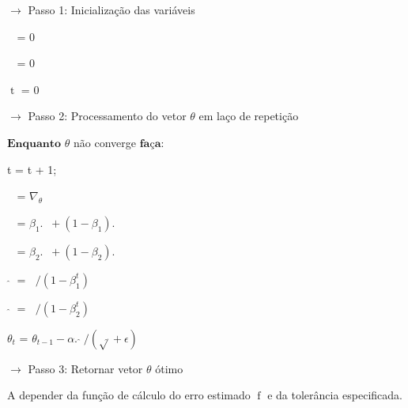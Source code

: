 $\longrightarrow$ Passo 1: Inicialização das variáveis

$\mathop{m_{0}}$ = 0

$\mathop{v_{0}}$ = 0

$\mathop{t}$ = 0

$\longrightarrow$ Passo 2: Processamento do vetor $\theta$ em laço de repetição

$\mathbf{Enquanto}$ $\theta$ não converge $\mathbf{faça:}$

t = t + 1;

$\mathop{g_{t}}$ = $\nabla_{\theta}\mathop{f_{t}(\theta_{t-1})}$

$\mathop{m_{t}}$ = $\beta_{1}.\mathop{m_{t-1}}+(1-\beta_{1}).\mathop{g_{t}}$

$\mathop{v_{t}}$ = $\beta_{2}.\mathop{v_{t-1}}+(1-\beta_{2}).\mathop{g_{t}^2}$

$\hat{\mathop{m_{t}}}$ = $\mathop{m_{t}}/(1-\beta_{1}^{t})$

$\hat{\mathop{v_{t}}}$ = $\mathop{v_{t}}/(1-\beta_{2}^{t})$

$\theta_{t}$ = $\theta_{t-1}-\alpha.\hat{\mathop{m_{t}}}/(\sqrt{\hat{\mathop{v_{t}}}}+\epsilon)$

$\longrightarrow$ Passo 3: Retornar vetor $\theta$ ótimo

A depender da função de cálculo do erro estimado $\mathop{f(\theta)}$ e da tolerância especificada.


